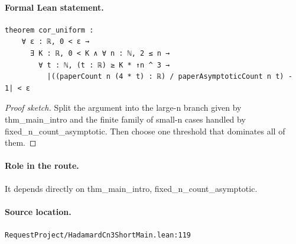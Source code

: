 \medskip
\paragraph{Formal Lean statement.}
\begin{verbatim}
theorem cor_uniform :
    ∀ ε : ℝ, 0 < ε →
      ∃ K : ℝ, 0 < K ∧ ∀ n : ℕ, 2 ≤ n →
        ∀ t : ℕ, (t : ℝ) ≥ K * ↑n ^ 3 →
          |((paperCount n (4 * t) : ℝ) / paperAsymptoticCount n t) - 1| < ε
\end{verbatim}
\begin{proof}[Proof sketch]
Split the argument into the large-n branch given by thm\_main\_intro and the finite family of small-n cases handled by fixed\_n\_count\_asymptotic. Then choose one threshold that dominates all of them.
\end{proof}
\paragraph{Role in the route.}
It depends directly on thm\_main\_intro, fixed\_n\_count\_asymptotic.
\paragraph{Source location.}
\texttt{RequestProject/HadamardCn3ShortMain.lean:119}
\medskip
